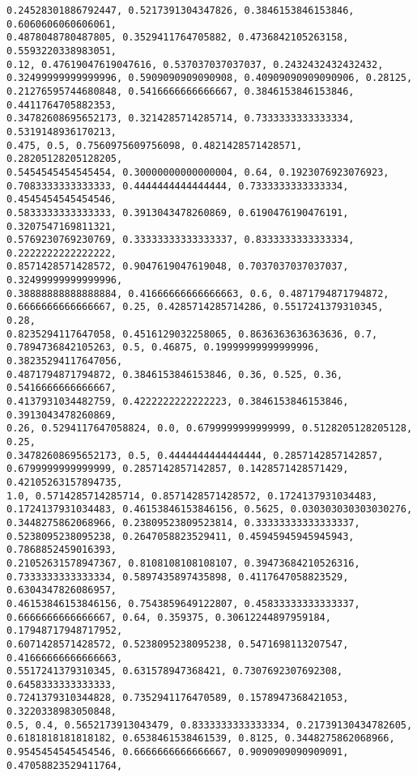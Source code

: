 \documentclass[11pt]{article}
\begin{document}
\begin{Verbatim}[commandchars=\\\{\}]
0.24528301886792447, 0.5217391304347826, 0.3846153846153846, 0.6060606060606061,
0.4878048780487805, 0.3529411764705882, 0.4736842105263158, 0.5593220338983051,
0.12, 0.47619047619047616, 0.537037037037037, 0.2432432432432432,
0.32499999999999996, 0.5909090909090908, 0.40909090909090906, 0.28125,
0.21276595744680848, 0.5416666666666667, 0.3846153846153846, 0.4411764705882353,
0.34782608695652173, 0.3214285714285714, 0.7333333333333334, 0.5319148936170213,
0.475, 0.5, 0.7560975609756098, 0.4821428571428571, 0.28205128205128205,
0.5454545454545454, 0.30000000000000004, 0.64, 0.1923076923076923,
0.7083333333333333, 0.4444444444444444, 0.7333333333333334, 0.4545454545454546,
0.5833333333333333, 0.3913043478260869, 0.6190476190476191, 0.3207547169811321,
0.5769230769230769, 0.33333333333333337, 0.8333333333333334, 0.2222222222222222,
0.8571428571428572, 0.9047619047619048, 0.7037037037037037, 0.32499999999999996,
0.38888888888888884, 0.41666666666666663, 0.6, 0.4871794871794872,
0.6666666666666667, 0.25, 0.4285714285714286, 0.5517241379310345, 0.28,
0.8235294117647058, 0.4516129032258065, 0.8636363636363636, 0.7,
0.7894736842105263, 0.5, 0.46875, 0.19999999999999996, 0.38235294117647056,
0.4871794871794872, 0.3846153846153846, 0.36, 0.525, 0.36, 0.5416666666666667,
0.4137931034482759, 0.4222222222222223, 0.3846153846153846, 0.3913043478260869,
0.26, 0.5294117647058824, 0.0, 0.6799999999999999, 0.5128205128205128, 0.25,
0.34782608695652173, 0.5, 0.4444444444444444, 0.2857142857142857,
0.6799999999999999, 0.2857142857142857, 0.1428571428571429, 0.42105263157894735,
1.0, 0.5714285714285714, 0.8571428571428572, 0.1724137931034483,
0.1724137931034483, 0.46153846153846156, 0.5625, 0.030303030303030276,
0.3448275862068966, 0.23809523809523814, 0.33333333333333337,
0.5238095238095238, 0.2647058823529411, 0.45945945945945943, 0.7868852459016393,
0.21052631578947367, 0.8108108108108107, 0.39473684210526316,
0.7333333333333334, 0.5897435897435898, 0.4117647058823529, 0.6304347826086957,
0.46153846153846156, 0.7543859649122807, 0.45833333333333337,
0.6666666666666667, 0.64, 0.359375, 0.30612244897959184, 0.17948717948717952,
0.6071428571428572, 0.5238095238095238, 0.5471698113207547, 0.41666666666666663,
0.5517241379310345, 0.631578947368421, 0.7307692307692308, 0.6458333333333333,
0.7241379310344828, 0.7352941176470589, 0.1578947368421053, 0.3220338983050848,
0.5, 0.4, 0.5652173913043479, 0.8333333333333334, 0.21739130434782605,
0.6181818181818182, 0.6538461538461539, 0.8125, 0.3448275862068966,
0.9545454545454546, 0.6666666666666667, 0.9090909090909091, 0.47058823529411764,

\end{Verbatim}
\end{document}
